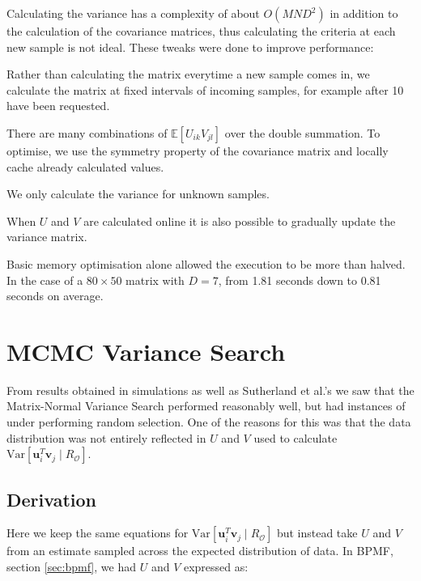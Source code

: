 Calculating the variance has a complexity of about $O(MND^2)$ in addition to the calculation of the covariance matrices, thus calculating the criteria at each new sample is not ideal. These tweaks were done to improve performance: 

\begin{description}[style=standard,leftmargin=.7cm,font=\itshape]
  \item[Variance Matrix Calculation Update] Rather than calculating the matrix everytime a new sample comes in, we calculate the matrix at fixed intervals of incoming samples, for example after 10 have been requested.
  \item[Memory Optimisation] There are many combinations of $\mathbb{E}[U_{ik}V_{jl}]$ over the double summation. To optimise, we use the symmetry property of the covariance matrix and locally cache already calculated values.
  \item[Unknown Samples] We only calculate the variance for unknown samples.
  \item[Online Updating] When $U$ and $V$ are calculated online it is also possible to gradually update the variance matrix.

\end{description}

Basic memory optimisation alone allowed the execution to be more than halved. In the case of a $80 \times 50$ matrix with $D=7$, from 1.81 seconds down to 0.81 seconds on average.


\section{MCMC Variance Search}
\label{sec:mcmcvar}
From results obtained in simulations as well as Sutherland et al.'s we saw that the Matrix-Normal Variance Search performed reasonably well, but had instances of under performing random selection. One of the reasons for this was that the data distribution was not entirely reflected in $U$ and $V$ used to calculate $\mathrm{Var}[\mathbf{u}_i^T \mathbf{v}_j \mid R_\mathcal{O}]$. 
\subsection{Derivation}
Here we keep the same equations for $\mathrm{Var}[\mathbf{u}_i^T \mathbf{v}_j \mid R_\mathcal{O}]$ but instead take $U$ and $V$ from an estimate sampled across the expected distribution of data. In BPMF, section \ref{sec:bpmf}, we had $U$ and $V$ expressed as:

